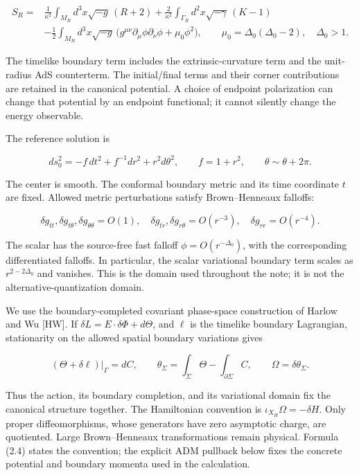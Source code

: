 \[
\begin{aligned}
S_R={}&\frac1{\kappa^2}\int_{M_R}d^3x\sqrt{-g}\,(R+2)
+\frac2{\kappa^2}\int_{\Gamma_R}d^2x\sqrt{-\gamma}\,(K-1)\\
&-\frac12\int_{M_R}d^3x\sqrt{-g}\,
\bigl(g^{\mu\nu}\partial_\mu\phi\partial_\nu\phi+\mu_0\phi^2\bigr),
\qquad
\mu_0=\Delta_0(\Delta_0-2),\quad \Delta_0>1 .
\end{aligned}
\tag{2.1}
\]

The timelike boundary term includes the extrinsic-curvature term and the unit-radius AdS counterterm. The initial/final terms and their corner contributions are retained in the canonical potential. A choice of endpoint polarization can change that potential by an endpoint functional; it cannot silently change the energy observable.

The reference solution is

\[
ds_0^2=-f\,dt^2+f^{-1}dr^2+r^2d\theta^2,
\qquad f=1+r^2,\qquad \theta\sim\theta+2\pi .
\tag{2.2}
\]

The center is smooth. The conformal boundary metric and its time coordinate \(t\) are fixed. Allowed metric perturbations satisfy Brown--Henneaux falloffs:

\[
\delta g_{tt},\delta g_{t\theta},\delta g_{\theta\theta}=O(1),
\quad
\delta g_{tr},\delta g_{r\theta}=O(r^{-3}),
\quad
\delta g_{rr}=O(r^{-4}).
\tag{2.3}
\]

The scalar has the source-free fast falloff \(\phi=O(r^{-\Delta_0})\), with the corresponding differentiated falloffs. In particular, the scalar variational boundary term scales as \(r^{2-2\Delta_0}\) and vanishes. This is the domain used throughout the note; it is not the alternative-quantization domain.

We use the boundary-completed covariant phase-space construction of Harlow and Wu {[}HW{]}. If \(\delta L=E\cdot\delta\Phi+d\Theta\), and \(\ell\) is the timelike boundary Lagrangian, stationarity on the allowed spatial boundary variations gives

\[
(\Theta+\delta\ell)|_{\Gamma}=dC,\qquad
\theta_\Sigma=\int_\Sigma\Theta-\int_{\partial\Sigma}C,
\qquad
\Omega=\delta\theta_\Sigma .
\tag{2.4}
\]

Thus the action, its boundary completion, and its variational domain fix the canonical structure together. The Hamiltonian convention is \(\iota_{X_H}\Omega=-\delta H\). Only proper diffeomorphisms, whose generators have zero asymptotic charge, are quotiented. Large Brown--Henneaux transformations remain physical. Formula (2.4) states the convention; the explicit ADM pullback below fixes the concrete potential and boundary momenta used in the calculation.

